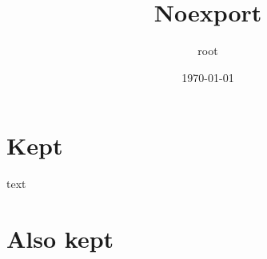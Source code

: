 \documentclass[11pt]{article}
\author{root}
\date{\today}
\title{Noexport}
\begin{document}
\maketitle
\tableofcontents

\section{Kept}
\label{sec:orgc0ee79b}
text
\section{Also kept}
\label{sec:orgd4599d7}
\end{document}
